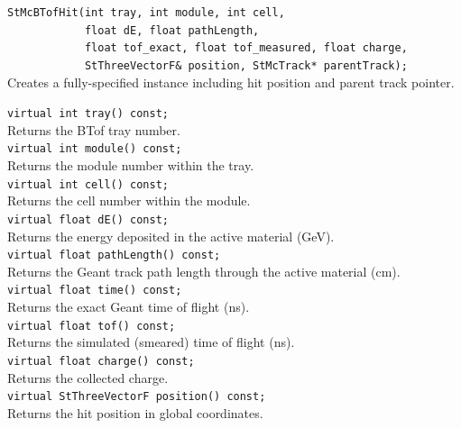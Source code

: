 \begin{Entry}
    \verb+StMcBTofHit(int tray, int module, int cell,+\\
    \verb+            float dE, float pathLength,+\\
    \verb+            float tof_exact, float tof_measured, float charge,+\\
    \verb+            StThreeVectorF& position, StMcTrack* parentTrack);+\\
    Creates a fully-specified instance including hit position and
    parent track pointer.

\item[Public Member\\ Functions]
    \verb+virtual int tray() const;+\\
    Returns the BTof tray number.\\

    \verb+virtual int module() const;+\\
    Returns the module number within the tray.\\

    \verb+virtual int cell() const;+\\
    Returns the cell number within the module.\\

    \verb+virtual float dE() const;+\\
    Returns the energy deposited in the active material (GeV).\\

    \verb+virtual float pathLength() const;+\\
    Returns the Geant track path length through the active material (cm).\\

    \verb+virtual float time() const;+\\
    Returns the exact Geant time of flight (ns).\\

    \verb+virtual float tof() const;+\\
    Returns the simulated (smeared) time of flight (ns).\\

    \verb+virtual float charge() const;+\\
    Returns the collected charge.\\

    \verb+virtual StThreeVectorF position() const;+\\
    Returns the hit position in global coordinates.\\


\end{Entry}

